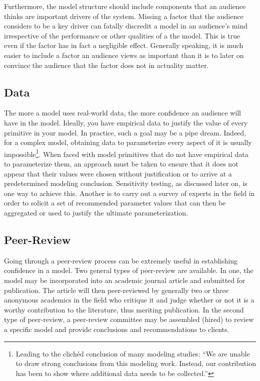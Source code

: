 \documentclass[]{memoir}
\begin{document}
Furthermore, the model structure should include components that an
audience thinks are important drivers of the system. Missing a factor
that the audience considers to be a key driver can fatally discredit a
model in an audience's mind irrespective of the performance or other
qualities of a the model. This is true even if the factor has in fact a
negligible effect. Generally speaking, it is much easier to include a
factor an audience views as important than it is to later on convince
the audience that the factor does not in actuality matter.

\subsection{Data}

The more a model uses real-world data, the more confidence an audience
will have in the model. Ideally, you have empirical data to justify the
value of every primitive in your model. In practice, such a goal may be
a pipe dream. Indeed, for a complex model, obtaining data to
parameterize every aspect of it is usually impossible\footnote{Leading
  to the clichéd conclusion of many modeling studies: ``We are unable to
  draw strong conclusions from this modeling work. Instead, our
  contribution has been to show where additional data needs to be
  collected.''}. When faced with model primitives that do not have
empirical data to parameterize them, an approach must be taken to ensure
that it does not appear that their values were chosen without
justification or to arrive at a predetermined modeling conclusion.
Sensitivity testing, as discussed later on, is one way to achieve this.
Another is to carry out a survey of experts in the field in order to
solicit a set of recommended parameter values that can then be
aggregated or used to justify the ultimate parameterization.

\subsection{Peer-Review}

Going through a peer-review process can be extremely useful in
establishing confidence in a model. Two general types of peer-review are
available. In one, the model may be incorporated into an academic
journal article and submitted for publication. The article will then
peer-reviewed by generally two or three anonymous academics in the field
who critique it and judge whether or not it is a worthy contribution to
the literature, thus meriting publication. In the second type of
peer-review, a peer-review committee may be assembled (hired) to review
a specific model and provide conclusions and recommendations to clients.
\end{document}
